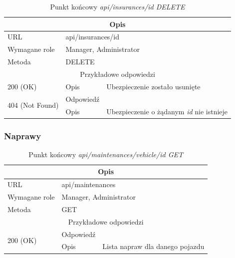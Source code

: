 \documentclass[eng,printmode,openany]{mgr}
\begin{document}
\begin{table}[H]
	\caption{Punkt końcowy \textit{api/insurances/id DELETE}}
	\begin{tabularx}{\textwidth}{|l|l|X|}
		\hline
		\multicolumn{3}{|c|}{Opis}                         						\\ \hline
		URL                       & \multicolumn{2}{l|}{api/insurances/id} 	    \\ \hline
		Wymagane role             & \multicolumn{2}{l|}{Manager, Administrator} \\ \hline
		Metoda                    & \multicolumn{2}{l|}{DELETE} 				\\ \hline
		\multicolumn{3}{|c|}{ Przykładowe odpowiedzi}                   		\\ \hline
		200 (OK)			& Opis         	& Ubezpieczenie zostało usunięte	\\ \hline
		\multirow{2}{*}{404 (Not Found)} 	& Odpowiedź     &     \\ \cline{2-3} 
		& Opis          & Ubezpieczenie o żądanym \textit{id} nie istnieje  							        \\ \hline		
	\end{tabularx}
\end{table}

\subsubsection{Naprawy}
\begin{table}[H]
	\caption{Punkt końcowy \textit{api/maintenances/vehicle/id GET}}
	\begin{tabularx}{\textwidth}{|l|l|X|}
		\hline
		\multicolumn{3}{|c|}{Opis}                         						\\ \hline
		URL                       & \multicolumn{2}{l|}{api/maintenances} 	    \\ \hline
		Wymagane role             & \multicolumn{2}{l|}{Manager, Administrator}               \\ \hline
		Metoda                    & \multicolumn{2}{l|}{GET} 					\\ \hline
		\multicolumn{3}{|c|}{ Przykładowe odpowiedzi}                   		\\ \hline
		\multirow{2}{*}{200 (OK)} 			& Odpowiedź     &      \\ \cline{2-3} 
		& Opis         	& Lista napraw dla danego pojazdu		      		                                \\ \hline
	\end{tabularx}
\end{table}
\end{document}
